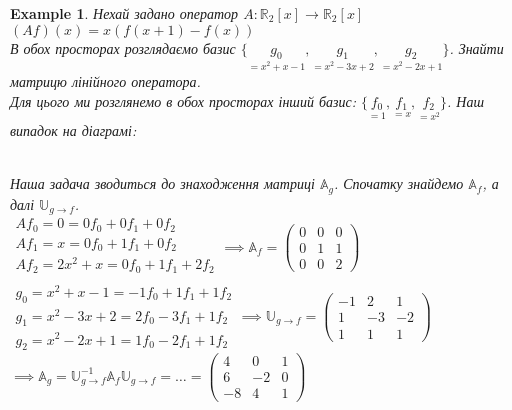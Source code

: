 \documentclass[a4paper, 10pt]{article}
\theoremstyle{theoremdd}
\theoremstyle{theoremdd}
\theoremstyle{theoremdd}
\theoremstyle{theoremdd}
\newtheorem{example}[theorem]{Example}
\theoremstyle{theoremdd}
\theoremstyle{theoremdd}
\theoremstyle{theoremdd}
\theoremstyle{theoremdd}
\begin{document}
\begin{example}
Нехай задано оператор $A: \mathbb{R}_2[x] \to \mathbb{R}_2[x]$\\
$(Af)(x) = x(f(x+1)-f(x))$\\
В обох просторах розглядаємо базис $\{\underset{=x^2+x-1}{g_0},\underset{=x^2-3x+2}{g_1},\underset{=x^2-2x+1}{g_2}\}$. Знайти матрицю лінійного оператора.\\
Для цього ми розглянемо в обох просторах інший базис: $\{\underset{=1}{f_0},\underset{=x}{f_1},\underset{=x^2}{f_2}\}$. Наш випадок на діаграмі:\\
\\
Наша задача зводиться до знаходження матриці $\mathbb{A}_g$. Спочатку знайдемо $\mathbb{A}_f$, а далі $\mathbb{U}_{g \to f}$.\\
$
\begin{gathered}
Af_0 = 0 = 0f_0 + 0f_1 + 0f_2\\
Af_1 = x = 0f_0 + 1f_1 + 0f_2\\
Af_2 = 2x^2+x = 0f_0+1f_1+2f_2\\
\end{gathered} \implies \mathbb{A}_f = \begin{pmatrix}
0 & 0 & 0 \\
0 & 1 & 1 \\
0 & 0 & 2
\end{pmatrix}
$
\bigskip \\
$
\begin{gathered}
g_0 = x^2+x-1 = -1f_0+1f_1+1f_2\\
g_1 = x^2-3x+2 = 2f_0-3f_1+1f_2\\
g_2 = x^2-2x+1 = 1f_0-2f_1+1f_2
\end{gathered} \implies \mathbb{U}_{g \to f} = \begin{pmatrix}
-1 & 2 & 1 \\
1 & -3 & -2 \\
1 & 1 & 1
\end{pmatrix}
$\\
$\implies \mathbb{A}_g = \mathbb{U}_{g \to f}^{-1} \mathbb{A}_f \mathbb{U}_{g \to f} = \dots = \begin{pmatrix}
4 & 0 & 1 \\
6 & -2 & 0 \\
-8 & 4 & 1
\end{pmatrix}$
\end{example}
\end{document}
